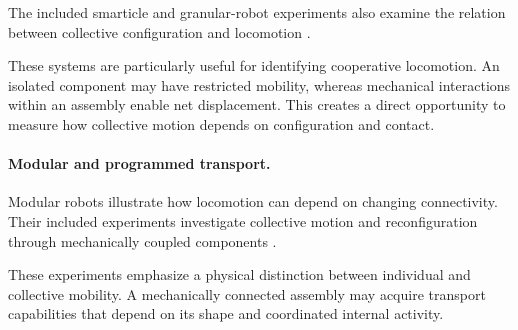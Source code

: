 The included smarticle and granular-robot
experiments also examine the relation
between collective configuration and
locomotion
\cite{Li2018supersmarticlealo,Bhamla2021collectivetransport,Vardhan2022glidersinshapecha,Savoie2018phototacticsupersma,OzkanAydin2020collectiveprotectio,Warkentin2018locomotingrobotsco,Savoie2019arobotmadeofrobo,Li2020programmingactiveg}.

These systems are particularly useful for
identifying cooperative locomotion.
An isolated component may have restricted
mobility, whereas mechanical interactions
within an assembly enable net displacement.
This creates a direct opportunity to
measure how collective motion depends
on configuration and contact.



\paragraph*{Modular and programmed transport.}

Modular robots illustrate how locomotion
can depend on changing connectivity.
Their included experiments investigate
collective motion and reconfiguration
through mechanically coupled components
\cite{Yang2024selfamputatingand,Hu2026diatominspired1di,Yi2025reconfigurablerobot,Rogowski2026coordinatedselfass,Zhao2024snailinspiredrobot,Zhang2026anisotropicshapesh,Li2019particleroboticsba,Bhattacharjee2026collectiveassembly,Oliveri2021continuouslearning,Drew2021acousticcommunicati,Kaeser2025individualandcolle,Rogowski2020magneticallyprogram,Ding2025transformablemodula,Ceron2021softroboticoscilla,Zhao2022softlatticemodules,Wang2026oscillatingeelrobo,Bhattacharjee2026closedloopselfass,Ma2026crosslinkcollectiv,ICHIKAWA2004emergentbehaviorso}.

These experiments emphasize a physical
distinction between individual and
collective mobility. A mechanically
connected assembly may acquire
transport capabilities that depend
on its shape and coordinated
internal activity.


